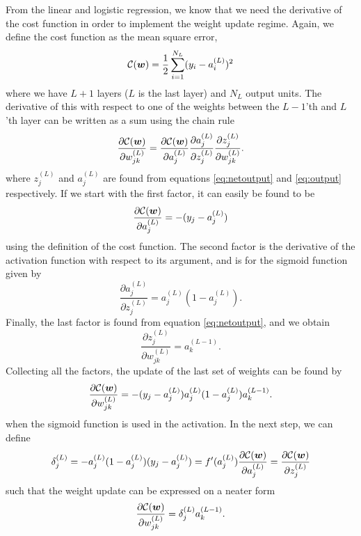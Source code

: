 From the linear and logistic regression, we know that we need the derivative of the cost function in order to implement the weight update regime. Again, we define the cost function as the mean square error,
\begin{equation}
\mathcal{C}(\boldsymbol{{w}})=\frac{1}{2}\sum_{i=1}^{N_L}(y_i-a_i^{(L)})^2
\end{equation}
where we have $L+1$ layers ($L$ is the last layer) and $N_L$ output units. The derivative of this with respect to one of the weights between the $L-1$'th and $L$'th layer can be written as a sum using the chain rule
\begin{equation}
\frac{\partial\mathcal{C}(\boldsymbol{{w}})}{\partial w_{jk}^{(L)}}=\frac{\partial\mathcal{C}(\boldsymbol{{w}})}{\partial a_j^{(L)}}\frac{\partial a_j^{(L)}}{\partial z_j^{(L)}}\frac{\partial z_j^{(L)}}{\partial w_{jk}^{(L)}}.
\end{equation}
where $z_j^{(L)}$ and $a_j^{(L)}$ are found from equations \eqref{eq:netoutput} and \eqref{eq:output} respectively. If we start with the first factor, it can easily be found to be 
\begin{equation}
\frac{\partial\mathcal{C}(\boldsymbol{{w}})}{\partial a_j^{(L)}}=-(y_j-a_j^{(L)})
\end{equation}
using the definition of the cost function. The second factor is the derivative of the activation function with respect to its argument, and is for the sigmoid function given by
\begin{equation}
\frac{\partial a_j^{(L)}}{\partial z_j^{(L)}}=a_j^{(L)}(1-a_j^{(L)}).
\end{equation}
Finally, the last factor is found from equation \eqref{eq:netoutput}, and we obtain
\begin{equation}
\frac{\partial z_j^{(L)}}{\partial w_{jk}^{(L)}}=a_k^{(L-1)}.
\end{equation}
Collecting all the factors, the update of the last set of weights can be found by
\begin{equation}
\frac{\partial\mathcal{C}(\boldsymbol{{w}})}{\partial w_{jk}^{(L)}}=-(y_j-a_j^{(L)})a_j^{(L)}(1-a_j^{(L)})a_k^{(L-1)}.
\end{equation}
when the sigmoid function is used in the activation. In the next step, we can define
\begin{equation}
\delta_j^{(L)}=-a_j^{(L)}(1-a_j^{(L)})(y_j-a_j^{(L)})=f'(a_j^{(L)})\frac{\partial \mathcal{C}(\boldsymbol{{w}})}{\partial a_j^{(L)}}=\frac{\partial \mathcal{C}(\boldsymbol{{w}})}{\partial z_j^{(L)}}
\end{equation}
such that the weight update can be expressed on a neater form
\begin{equation}
\frac{\partial\mathcal{C}(\boldsymbol{{w}})}{\partial w_{jk}^{(L)}}=\delta_j^{(L)}a_k^{(L-1)}.
\end{equation}

